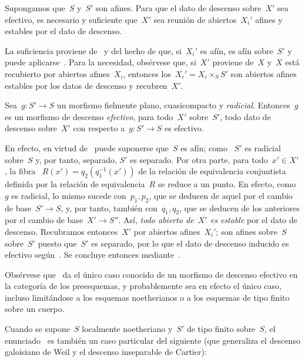 \begin{corollaire}
\label{VIII.7.4}
Supongamos que~$S$ y~$S'$ son afines. Para que el dato de descenso sobre~$X'$
sea efectivo, es necesario y suficiente que~$X'$ sea reunión de
abiertos~$X_{i}'$ afines y estables por el dato de descenso.
\end{corollaire}

La suficiencia proviene de~ y del hecho de que, si~$X_{i}'$ es
afín, es afín sobre~$S'$ y puede aplicarse~. Para la necesidad,
obsérvese que, si~$X'$ proviene de~$X$ y~$X$ está recubierto por abiertos
afines~$X_{i}$, entonces los~$X_{i}'=X_{i}\times_{S}S'$ son abiertos afines
estables por los datos de descenso y recubren~$X'$.

\begin{corollaire}
\label{VIII.7.5}
Sea~$g\colon S'\to S$ un morfismo fielmente plano, cuasicompacto y
\emph{radicial}. Entonces~$g$ es un morfismo de descenso \emph{efectivo},
\ie para todo~$X'$ sobre~$S'$, todo dato de descenso sobre~$X'$ con respecto
a~$g\colon S'\to S$ es efectivo.
\end{corollaire}

En efecto, en virtud de~ puede suponerse que~$S$ es afín; como
~$S'$ es radicial sobre~$S$ y, por tanto, separado, $S'$ es separado. Por
otra parte, para todo~$x'\in X'$, la fibra
~$R(x')=q_{2}(q_{1}^{-1}(x'))$ de la relación de equivalencia conjuntista
definida
por la relación de equivalencia~$R$ se reduce a un punto. En efecto, como~$g$
es radicial, lo mismo sucede con~$p_{1},p_{2}$, que se deducen de aquel por
el cambio de base~$S'\to S$, y, por tanto, también con~$q_{1},q_{2}$, que se
deducen de los anteriores por el cambio de base~$X'\to S''$. Así,
\emph{todo abierto de~$X'$ es estable} por el dato de descenso. Recubramos
entonces~$X'$ por abiertos afines~$X_{i}'$; son afines
{sobre~$S$}
{sobre~$S'$}
puesto que~$S'$ es separado, por lo que el dato de descenso inducido es
efectivo según~. Se concluye entonces mediante~.

Obsérvese que~ da el único caso conocido de un morfismo de
descenso efectivo en la categoría de los preesquemas, y probablemente sea
en efecto el único caso, incluso limitándose a los esquemas noetherianos o a
los esquemas de tipo finito sobre un cuerpo.

Cuando se supone~$S$ localmente noetheriano y~$S'$ de tipo finito sobre~$S$,
el enunciado~ es también un caso particular del siguiente (que
generaliza el descenso galoisiano de Weil y el descenso inseparable de
Cartier):

